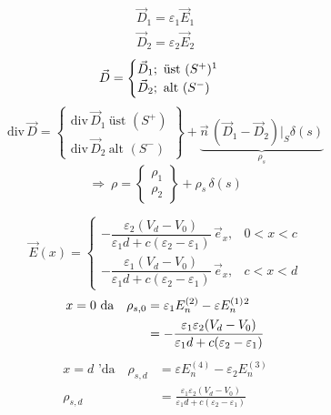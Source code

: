 \documentclass[11pt,a4paper]{article}
\begin{document}
\begin{gather*}
\vec D_1=\varepsilon_1\vec E_1\\
\vec D_2=\varepsilon_2\vec E_2
\end{gather*}
\[ \vec D=\begin{cases}\vec D_1;\ \text{üst }(S^{+})\text{\footnotemark}\\ \vec D_2;\ \text{alt }(S^{-})\end{cases} \]
\[ \mathrm{div}\,\vec D=\begin{Bmatrix}\mathrm{div}\,\vec D_1\ \text{üst }(S^{+})\\ \mathrm{div}\,\vec D_2\ \text{alt }(S^{-})\end{Bmatrix}+\underbrace{\vec n\,(\vec D_1-\vec D_2)\Big|_S\delta(s)}_{\rho_s} \]
\[ \Rightarrow\ \rho=\begin{Bmatrix}\rho_1\\ \rho_2\end{Bmatrix}+\rho_s\,\delta(s) \]

\[ \vec E(x)=\begin{cases}-\dfrac{\varepsilon_2(V_d-V_0)}{\varepsilon_1d+c(\varepsilon_2-\varepsilon_1)}\,\vec e_x, & 0<x<c\\[4mm] -\dfrac{\varepsilon_1(V_d-V_0)}{\varepsilon_1d+c(\varepsilon_2-\varepsilon_1)}\,\vec e_x, & c<x<d\end{cases} \]
\begin{align*}
x=0\text{ da}\quad\rho_{s,0}&=\varepsilon_1E_n^{(2)}-\varepsilon E_n^{(1)}\text{\footnotemark}\\
&=-\frac{\varepsilon_1\varepsilon_2(V_d-V_0)}{\varepsilon_1d+c(\varepsilon_2-\varepsilon_1)}
\end{align*}
\begin{align*}
x=d\text{ 'da}\quad\rho_{s,d}&=\varepsilon E_n^{(4)}-\varepsilon_2E_n^{(3)}\\
\rho_{s,d}&=\frac{\varepsilon_1\varepsilon_2(V_d-V_0)}{\varepsilon_1d+c(\varepsilon_2-\varepsilon_1)}
\end{align*}
\end{document}
